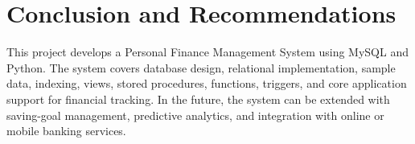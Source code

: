 \section{Conclusion and Recommendations}
This project develops a Personal Finance Management System using MySQL and Python. The system covers database design, relational implementation, sample data, indexing, views, stored procedures, functions, triggers, and core application support for financial tracking. In the future, the system can be extended with saving-goal management, predictive analytics, and integration with online or mobile banking services.
